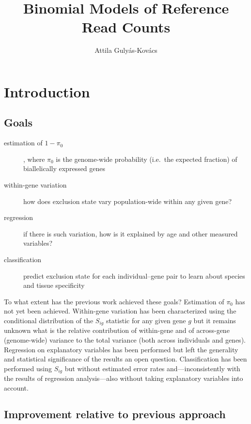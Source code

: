 \documentclass[letterpaper]{article}
\title{Binomial Models of Reference Read Counts}
\author{Attila Gulyás-Kovács}
\begin{document}
\maketitle

\section{Introduction}

\subsection{Goals}

\begin{description}
\item[estimation of \(1-\pi_0\)], where \(\pi_0\) is the genome-wide probability
(i.e.~the expected fraction) of biallelically
expressed genes
\item[within-gene variation] how does exclusion state vary
population-wide within any given gene?
\item[regression] if there is such variation, how is it explained by age and
other measured variables?
\item[classification] predict exclusion state for each individual--gene pair
to learn about species and tissue specificity
\end{description}

To what extent has the previous work achieved these goals?  Estimation of
\(\pi_0\) has not yet been achieved.  Within-gene variation has been
characterized using the conditional distribution of the \(S_{ig}\) statistic
for any given gene \(g\) but it remains unknown what is the relative contribution of within-gene and of
across-gene (genome-wide) variance to the total variance (both across
individuals and genes).  Regression on explanatory variables has been performed but
left the generality and statistical significance of the results an open
question.  Classification has been performed using \(S_{ig}\) but without
estimated error rates and---inconsistently with the results of regression
analysis---also without taking explanatory variables into account.

\subsection{Improvement relative to previous approach}
\label{sec:improvement}
\end{document}
